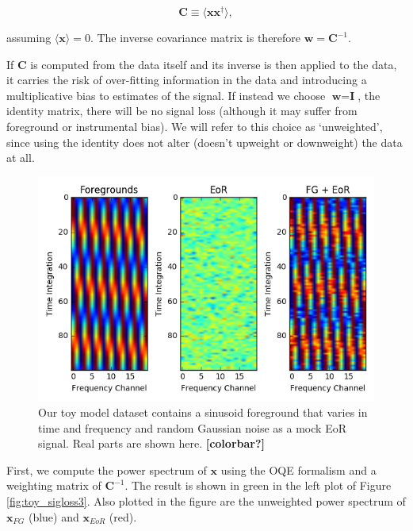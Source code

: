 \documentclass[preprint2,numberedappendix,tighten,twocolappendix]{aastex6}  %
\newcommand{\cc}[1]{{\color{purple} \textbf{[#1]}}}
\begin{document}
\begin{equation}
\textbf{C} \equiv \langle\textbf{xx}^{\dagger}\rangle,
\end{equation}

assuming $\langle\textbf{x}\rangle = 0$. The inverse covariance matrix is therefore $\textbf{w} = \textbf{C}^{-1}$.

If $\textbf{C}$ is computed from the data itself and its inverse is then applied to the data, it carries the risk of over-fitting information in the data and introducing a multiplicative bias to estimates of the signal. If instead we choose $\textbf{w} = \textbf{I}$, the identity matrix, there will be no signal loss (although it may suffer from foreground or instrumental bias). We will refer to this choice as `unweighted', since using the identity does not alter (doesn't upweight or downweight) the data at all.

\begin{figure}
	\centering
	\includegraphics[trim={0.3cm 0.2cm 0.3cm 0.3cm},clip,width=\columnwidth]{plots/toy_sigloss1.png}
	\caption{Our toy model dataset contains a sinusoid foreground that varies in time and frequency and random Gaussian noise as a mock EoR signal. Real parts are shown here. \cc{colorbar?}}
	\label{fig:toy_sigloss1}
\end{figure}

First, we compute the power spectrum of $\textbf{x}$ using the OQE formalism and a weighting matrix of $\textbf{C}^{-1}$. The result is shown in green in the left plot of Figure \ref{fig:toy_sigloss3}. Also plotted in the figure are the unweighted power spectrum of $\textbf{x}_{FG}$ (blue) and $\textbf{x}_{EoR}$ (red). 
\end{document}
